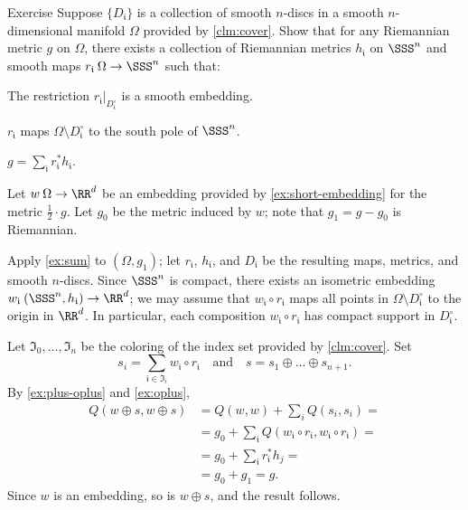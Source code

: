 \begin{thm}{Exercise}\label{ex:sum}
Suppose $\{D_{\mathfrak{i}}\}$ is a collection of smooth $n$-discs in a smooth $n$-dimensional manifold $\Omega$ provided by \ref{clm:cover}.
Show that for any Riemannian metric $g$ on $\Omega$, there exists a collection of Riemannian metrics $h_{\mathfrak{i}}$ on $\SSS^n$ and smooth maps $r_{\mathfrak{i}}\:\Omega \to \SSS^n$ such that:

\begin{subthm}{}
The restriction $r_{\mathfrak{i}}|_{D_{\mathfrak{i}}^\circ}$ is a smooth embedding.
\end{subthm}

\begin{subthm}{}
$r_{\mathfrak{i}}$ maps $\Omega\setminus D_{\mathfrak{i}}^\circ$ to the south pole of $\SSS^n$.
\end{subthm}

\begin{subthm}{}
$g=\sum_{\mathfrak{i}} r_{\mathfrak{i}}^*h_{\mathfrak{i}}$.
\end{subthm}
\end{thm}

Let $w\:\Omega\to\RR^d$ be an embedding provided by \ref{ex:short-embedding} for the metric $\tfrac12\cdot g$.
Let $g_0$ be the metric induced by $w$;
note that $g_1=g-g_0$ is Riemannian.

Apply \ref{ex:sum} to $(\Omega,g_1)$;
let $r_{\mathfrak{i}}$, $h_{\mathfrak{i}}$, and $D_{\mathfrak{i}}$ be the resulting maps, metrics, and smooth $n$-discs.
Since $\SSS^n$ is compact, there exists an isometric embedding $w_{\mathfrak{i}}\: (\SSS^n, h_{\mathfrak{i}}) \to \RR^d$;
we may assume that $w_{\mathfrak{i}} \circ r_{\mathfrak{i}}$ maps all points in $\Omega\setminus D_{\mathfrak{i}}^\circ$ to the origin in $\RR^d$.
In particular, each composition $w_{\mathfrak{i}} \circ r_{\mathfrak{i}}$ has compact support in $D_{\mathfrak{i}}^\circ$.

Let $\mathfrak{I}_0,\dots,\mathfrak{I}_n$ be the coloring of the index set provided by \ref{clm:cover}.
Set
\[s_i=\sum_{\mathfrak{i}\in \mathfrak{I}_i} w_{\mathfrak{i}}\circ r_{\mathfrak{i}}
\quad\text{and}\quad
s=s_1\oplus\dots\oplus s_{n+1}.
\]
By \ref{ex:plus-oplus} and \ref{ex:oplus},
\begin{align*}
Q(w\oplus s,w\oplus s)&=Q(w,w)+\sum_i Q(s_i,s_i)=
\\
&=g_0+\sum_{\mathfrak{i}} Q(w_{\mathfrak{i}}\circ r_{\mathfrak{i}},w_{\mathfrak{i}}\circ r_{\mathfrak{i}})=
\\
&=g_0+\sum_{\mathfrak{i}} r^*_{\mathfrak{i}}h_j=
\\
&=g_0+g_1=g.
\end{align*}
Since $w$ is an embedding, so is $w \oplus s$, and the result follows.
\qeds

















